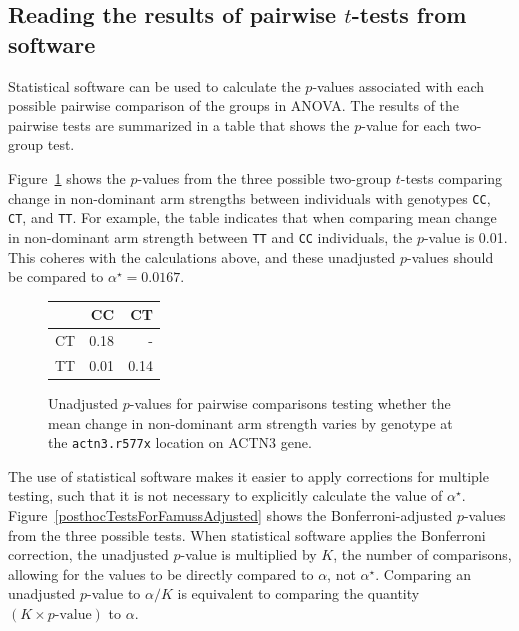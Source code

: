 

\textD{\newpage}


\subsection{Reading the results of pairwise $t$-tests from software}

Statistical software can be used to calculate the $p$-values associated with each possible pairwise comparison of the groups in ANOVA. The results of the pairwise tests are summarized in a table that shows the $p$-value for each two-group test. 

Figure~\ref{posthocTestsForFamussUnadjusted} shows the $p$-values from the three possible two-group $t$-tests comparing change in non-dominant arm strengths between individuals with genotypes \texttt{CC}, \texttt{CT}, and \texttt{TT}. For example, the table indicates that when comparing mean change in non-dominant arm strength between \texttt{TT} and \texttt{CC} individuals, the $p$-value is 0.01. This coheres with the calculations above, and these unadjusted $p$-values should be compared to $\alpha^\star = 0.0167$.

\begin{figure}[ht]
	\centering
	\begin{tabular}{rrr}
		\hline
		& CC & CT \\ 
		\hline
		CT & 0.18 &  - \\ 
		TT & 0.01 & 0.14 \\ 
		\hline
	\end{tabular}
	\caption{Unadjusted $p$-values for pairwise comparisons testing whether the mean change in non-dominant arm strength varies by genotype at the \texttt{actn3.r577x} location on ACTN3 gene.} 
	\label{posthocTestsForFamussUnadjusted}
\end{figure}

The use of statistical software makes it easier to apply corrections for multiple testing, such that it is not necessary to explicitly calculate the value of $\alpha^\star$. Figure~\ref{posthocTestsForFamussAdjusted} shows the Bonferroni-adjusted $p$-values from the three possible tests. When statistical software applies the Bonferroni correction, the unadjusted $p$-value is multiplied by $K$, the number of comparisons, allowing for the values to be directly compared to $\alpha$, not $\alpha^\star$. Comparing an unadjusted $p$-value to $\alpha/K$ is equivalent to comparing the quantity $(K \times p\text{-value})$ to $\alpha$.

